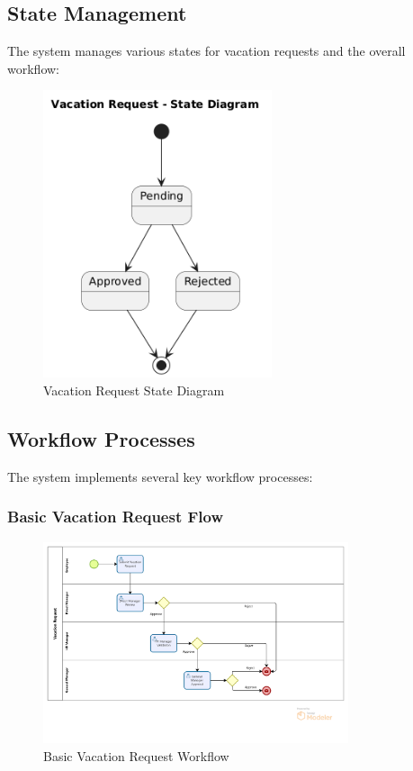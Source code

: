 \documentclass[12pt,a4paper]{article}
\begin{document}
\subsection{State Management}
The system manages various states for vacation requests and the overall workflow:

\begin{figure}[H]
\centering
\includegraphics[width=0.6\textwidth]{Diagrams/State-Diagram/State-Diagram.png}
\caption{Vacation Request State Diagram}
\label{fig:state-diagram}
\end{figure}

\subsection{Workflow Processes}
The system implements several key workflow processes:

\subsubsection{Basic Vacation Request Flow}
\begin{figure}[H]
\centering
\includegraphics[width=0.8\textwidth]{Diagrams/Workflows/Vacation-Request-Basic-Flow/Vacation-Request-Basic-Flow.png}
\caption{Basic Vacation Request Workflow}
\label{fig:basic-flow}
\end{figure}
\end{document}
